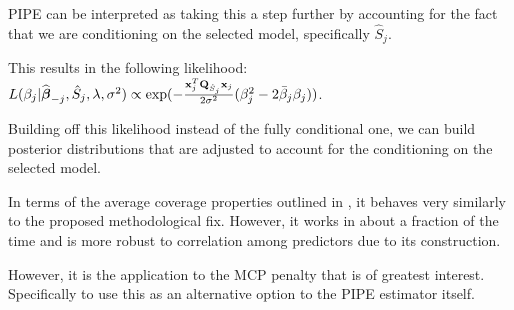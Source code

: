 PIPE can be interpreted as taking this a step further by accounting for the fact that we are conditioning on the selected model, specifically $\hat{S}_j$. 


This results in the following likelihood: $L(\beta_j|\widehat{\boldsymbol{\beta}}_{-j}, \hat{S}_j, \lambda, \sigma^2) \propto \exp(-\frac{\mathbf{x}_j^T \mathbf{Q}_{\hat{S}_j} \mathbf{x}_j}{2\sigma^2}(\beta_{j}^2 - 2 \bar{\beta}_{j} \beta_{j}))$. 

Building off this likelihood instead of the fully conditional one, we can build posterior distributions that are adjusted to account for the conditioning on the selected model.

In terms of the average coverage properties outlined in , it behaves very similarly to the proposed methodological fix. However, it works in about a fraction of the time and is more robust to correlation among predictors due to its construction. 

However, it is the application to the MCP penalty that is of greatest interest. Specifically to use this as an alternative option to the PIPE estimator itself.

